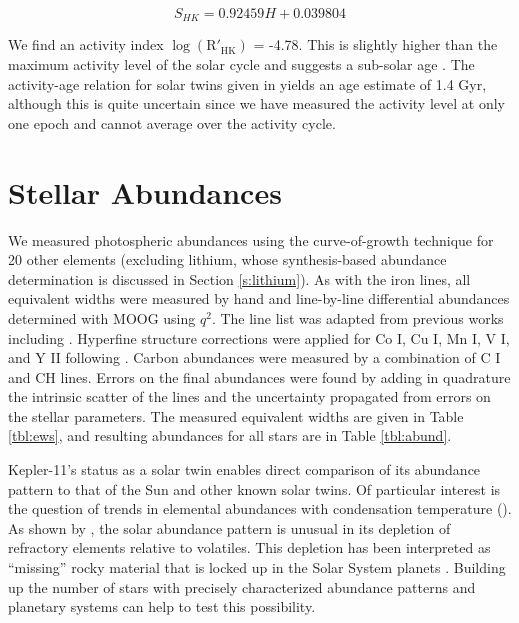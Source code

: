 \documentclass[oneside]{emulateapj}
\begin{document}
\begin{equation}
S_{HK} = 0.92459 H + 0.039804
\end{equation}

We find an activity index $\log(\mathrm{R'_{HK}})$ = -4.78. This is slightly higher than the maximum activity level of the solar cycle and suggests a sub-solar age \citep{Skumanich1972}. The activity-age relation for solar twins given in \citet{Freitas2016} yields an age estimate of 1.4 Gyr, although this is quite uncertain since we have measured the activity level at only one epoch and cannot average over the activity cycle.


\section{Stellar Abundances}
\label{s:abundances}

We measured photospheric abundances using the curve-of-growth technique for 20 other elements (excluding lithium, whose synthesis-based abundance determination is discussed in Section \ref{s:lithium}). As with the iron lines, all equivalent widths were measured by hand and line-by-line differential abundances determined with MOOG using $q^2$. The line list was adapted from previous works including \citet{Bedell2014}. Hyperfine structure corrections were applied for Co I, Cu I, Mn I, V I, and Y II following \citet{Melendez2012}. Carbon abundances were measured by a combination of C I and CH lines. Errors on the final abundances were found by adding in quadrature the intrinsic scatter of the lines and the uncertainty propagated from errors on the stellar parameters. The measured equivalent widths are given in Table \ref{tbl:ews}, and resulting abundances for all stars are in Table \ref{tbl:abund}.

Kepler-11's status as a solar twin enables direct comparison of its abundance pattern to that of the Sun and other known solar twins. Of particular interest is the question of trends in elemental abundances with condensation temperature (\tc). As shown by \citet{Melendez2009}, the solar abundance pattern is unusual in its depletion of refractory elements relative to volatiles. This depletion has been interpreted as ``missing'' rocky material that is locked up in the Solar System planets \citep{Chambers2010}. Building up the number of stars with precisely characterized abundance patterns and planetary systems can help to test this possibility.
\end{document}
